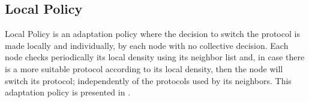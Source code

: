 \subsection{Local Policy}

Local Policy is an adaptation policy where the decision to switch the protocol is made locally and individually, by each node with no collective decision.
Each node checks periodically its local density using its neighbor list and, in case there is a more suitable protocol according to its local density, then the node will switch its protocol; independently of the protocols used by its neighbors.
This adaptation policy is presented in .

